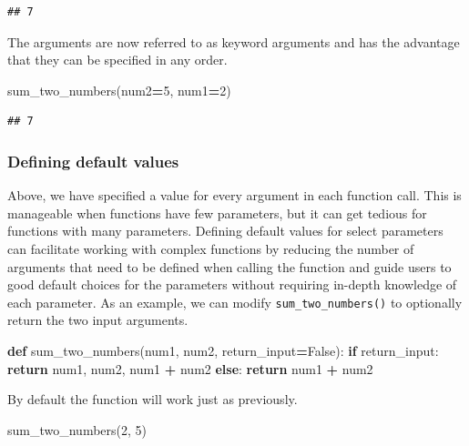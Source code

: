 \documentclass[]{Nemilov}
\newenvironment{Shaded}{\begin{snugshade}}{\end{snugshade}}
\newcommand{\ControlFlowTok}[1]{\textcolor[rgb]{0.13,0.29,0.53}{\textbf{#1}}}
\newcommand{\DecValTok}[1]{\textcolor[rgb]{0.00,0.00,0.81}{#1}}
\newcommand{\KeywordTok}[1]{\textcolor[rgb]{0.13,0.29,0.53}{\textbf{#1}}}
\newcommand{\NormalTok}[1]{#1}
\newcommand{\OperatorTok}[1]{\textcolor[rgb]{0.81,0.36,0.00}{\textbf{#1}}}
\newcommand{\VariableTok}[1]{\textcolor[rgb]{0.00,0.00,0.00}{#1}}
\begin{document}
\begin{verbatim}
## 7
\end{verbatim}

The arguments are now referred to as keyword arguments and has the advantage
that they can be specified in any order.

\begin{Shaded}
\begin{Highlighting}[]
\NormalTok{sum_two_numbers(num2}\OperatorTok{=}\DecValTok{5}\NormalTok{, num1}\OperatorTok{=}\DecValTok{2}\NormalTok{)}
\end{Highlighting}
\end{Shaded}

\begin{verbatim}
## 7
\end{verbatim}

\hypertarget{py-dev-defining-default-values}{%
\subsubsection{Defining default values}\label{py-dev-defining-default-values}}

Above, we have specified a value for every argument in each function call. This
is manageable when functions have few parameters, but it can get tedious for
functions with many parameters. Defining default values for select parameters
can facilitate working with complex functions by reducing the number of
arguments that need to be defined when calling the function and guide users to
good default choices for the parameters without requiring in-depth knowledge of
each parameter. As an example, we can modify \texttt{sum\_two\_numbers()} to optionally
return the two input arguments.

\begin{Shaded}
\begin{Highlighting}[]
\KeywordTok{def}\NormalTok{ sum_two_numbers(num1, num2, return_input}\OperatorTok{=}\VariableTok{False}\NormalTok{):}
    \ControlFlowTok{if}\NormalTok{ return_input:}
        \ControlFlowTok{return}\NormalTok{ num1, num2, num1 }\OperatorTok{+}\NormalTok{ num2}
    \ControlFlowTok{else}\NormalTok{:}
        \ControlFlowTok{return}\NormalTok{ num1 }\OperatorTok{+}\NormalTok{ num2}
\end{Highlighting}
\end{Shaded}

By default the function will work just as previously.

\begin{Shaded}
\begin{Highlighting}[]
\NormalTok{sum_two_numbers(}\DecValTok{2}\NormalTok{, }\DecValTok{5}\NormalTok{)}
\end{Highlighting}
\end{Shaded}
\end{document}
